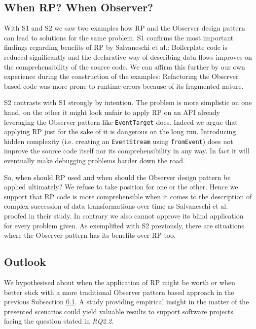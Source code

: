 \documentclass[12pt,a4paper]{article}
\begin{document}
\subsection{When RP? When Observer?}
\label{sec:when-rp-when-observer}

With S1 and S2 we saw two examples how RP and the Observer design pattern can lead to solutions for the same problem. S1 confirms the most important findings regarding benefits of RP by Salvaneschi et al.: Boilerplate code is reduced significantly and the declarative way of describing data flows improves on the comprehensibility of the source code. We can affirm this further by our own experience during the construction of the examples: Refactoring the Observer based code was more prone to runtime errors because of its fragmented nature.

S2 contrasts with S1 strongly by intention. The problem is more simplistic on one hand, on the other it might look unfair to apply RP on an API already leveraging the Observer pattern like \texttt{EventTarget} does. Indeed we argue that applying RP just for the sake of it is dangerous on the long run. Introducing hidden complexity (i.e. creating an \texttt{EventStream} using \texttt{fromEvent}) does not improve the source code itself nor its comprehensibility in any way. In fact it will eventually make debugging problems harder down the road.

So, when should RP used and when should the Observer design pattern be applied ultimately? We refuse to take position for one or the other. Hence we support that RP code is more comprehensible when it comes to the description of complex succession of data transformations over time as Salvaneschi et al. proofed in their study. In contrary we also cannot approve its blind application for every problem given. As exemplified with S2 previously, there are situations where the Observer pattern has its benefits over RP too.

\subsection{Outlook}

We hypothesised about when the application of RP might be worth or when better stick with a more traditional Observer pattern based approach in the previous Subsection \ref{sec:when-rp-when-observer}. A study providing empirical insight in the matter of the presented scenarios could yield valuable results to support software projects facing the question stated in \emph{RQ2.2}.
\end{document}

